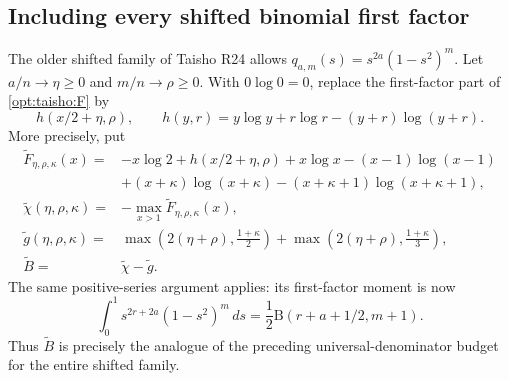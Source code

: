 \documentclass[11pt,a4paper]{article}
\numberwithin{equation}{section}
\theoremstyle{definition}\newtheorem{definition}[theorem]{Definition}
\theoremstyle{remark}\newtheorem{remark}[theorem]{Remark}
\begin{document}
\subsection{Including every shifted binomial first factor}
The older shifted family of Taisho R24 allows
$q_{a,m}(s)=s^{2a}(1-s^2)^m$. Let $a/n\to\eta\ge0$ and
$m/n\to\rho\ge0$. With $0\log0=0$, replace the first-factor part of
\eqref{opt:taisho:F} by
\[
 h(x/2+\eta,\rho),\qquad
 h(y,r)=y\log y+r\log r-(y+r)\log(y+r).
\]
More precisely, put
\begin{align*}
 \widetilde F_{\eta,\rho,\kappa}(x)
 ={}&-x\log2+h(x/2+\eta,\rho)
 +x\log x-(x-1)\log(x-1)\\
 &+(x+\kappa)\log(x+\kappa)
 -(x+\kappa+1)\log(x+\kappa+1),\\
 \widetilde\chi(\eta,\rho,\kappa)
 ={}&-\max_{x>1}\widetilde F_{\eta,\rho,\kappa}(x),\\
 \widetilde g(\eta,\rho,\kappa)
 ={}&\max\left(2(\eta+\rho),\frac{1+\kappa}{2}\right)
 +\max\left(2(\eta+\rho),\frac{1+\kappa}{3}\right),\\
 \widetilde B={}&\widetilde\chi-\widetilde g.
\end{align*}
The same positive-series argument applies: its first-factor moment is now
\[
 \int_0^1s^{2r+2a}(1-s^2)^m\,ds
 =\frac12\mathrm B(r+a+1/2,m+1).
\]
Thus $\widetilde B$ is precisely the analogue of the preceding
universal-denominator budget for the entire shifted family.
\end{document}
